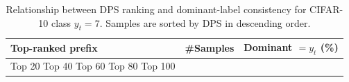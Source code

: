 \begin{table}[t]
\centering
\begin{tabular}{lrr}
\toprule
Top-ranked prefix & \#Samples & Dominant $= y_t$ (\%) \\
\midrule
Top 20%
Top 40%
Top 60%
Top 80%
Top 100%
\bottomrule
\caption{Relationship between DPS ranking and dominant-label consistency for CIFAR-10 class $y_t=7$. Samples are sorted by DPS in descending order.}
\label{tab:class_7_prefix}
\end{tabular}
\end{table}
